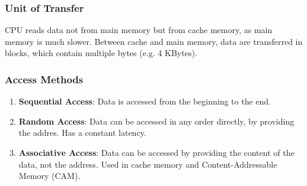 \subsubsection{Unit of Transfer}

CPU reads data not from main memory but from cache memory, as main memory is
much slower. Between cache and main memory, data are transferred in blocks, which
contain multiple bytes (e.g. 4 KBytes).

\subsubsection{Access Methods}

\begin{enumerate}
    \item \textbf{Sequential Access}: Data is accessed from the beginning to the end.
    \item \textbf{Random Access}: Data can be accessed in any order directly, by
        providing the addres. Has a constant latency.
    \item \textbf{Associative Access}: Data can be accessed by providing the content
        of the data, not the address. Used in cache memory and Content-Addressable
        Memory (CAM).
\end{enumerate}
